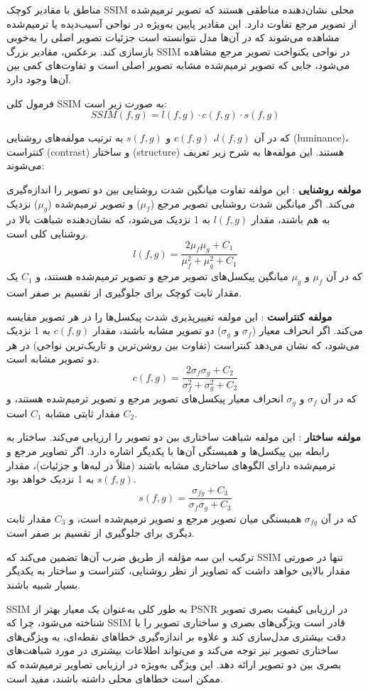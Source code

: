 مناطق با مقادیر کوچک SSIM محلی نشان‌دهنده مناطقی هستند که تصویر ترمیم‌شده از تصویر مرجع تفاوت دارد. این مقادیر پایین به‌ویژه در نواحی آسیب‌دیده یا ترمیم‌شده مشاهده می‌شوند که در آن‌ها مدل نتوانسته است جزئیات تصویر اصلی را به‌خوبی بازسازی کند. برعکس، مقادیر بزرگ SSIM در نواحی یکنواخت تصویر مرجع مشاهده می‌شود، جایی که تصویر ترمیم‌شده مشابه تصویر اصلی است و تفاوت‌های کمی بین آن‌ها وجود دارد.

فرمول کلی SSIM به صورت زیر است:
$$
SSIM(f, g) = l(f, g) \cdot c(f, g) \cdot s(f, g)
$$

که در آن $l(f, g)$، $c(f, g)$ و $s(f, g)$ به ترتیب مولفه‌های روشنایی (luminance)، کنتراست (contrast) و ساختار (structure) هستند. این مولفه‌ها به شرح زیر تعریف می‌شوند:

\textbf{مولفه روشنایی}%
: این مولفه تفاوت میانگین شدت روشنایی بین دو تصویر را اندازه‌گیری می‌کند. اگر میانگین شدت روشنایی تصویر مرجع ($\mu_f$) و تصویر ترمیم‌شده ($\mu_g$) نزدیک به هم باشند، مقدار $l(f, g)$ به 1 نزدیک می‌شود، که نشان‌دهنده شباهت بالا در روشنایی کلی است.
$$
l(f, g) = \frac{2\mu_f \mu_g + C_1}{\mu_f^2 + \mu_g^2 + C_1}
$$
که در آن $\mu_f$ و $\mu_g$ میانگین پیکسل‌های تصویر مرجع و تصویر ترمیم‌شده هستند، و $C_1$ یک مقدار ثابت کوچک برای جلوگیری از تقسیم بر صفر است.

\textbf{مولفه کنتراست}%
:    این مولفه تغییرپذیری شدت پیکسل‌ها را در هر تصویر مقایسه می‌کند. اگر انحراف معیار ($\sigma_f$ و $\sigma_g$) دو تصویر مشابه باشند، مقدار $c(f, g)$ به 1 نزدیک می‌شود، که نشان می‌دهد کنتراست (تفاوت بین روشن‌ترین و تاریک‌ترین نواحی) در هر دو تصویر مشابه است.
$$
c(f, g) = \frac{2\sigma_f \sigma_g + C_2}{\sigma_f^2 + \sigma_g^2 + C_2}
$$
که در آن $\sigma_f$ و $\sigma_g$ انحراف معیار پیکسل‌های تصویر مرجع و تصویر ترمیم‌شده هستند، و $C_2$ مقدار ثابتی مشابه $C_1$ است.

\textbf{مولفه ساختار}
: این مولفه شباهت ساختاری بین دو تصویر را ارزیابی می‌کند. ساختار به رابطه بین پیکسل‌ها و همبستگی آن‌ها با یکدیگر اشاره دارد. اگر تصاویر مرجع و ترمیم‌شده دارای الگوهای ساختاری مشابه باشند (مثلاً در لبه‌ها و جزئیات)، مقدار $s(f, g)$ به 1 نزدیک خواهد بود.
$$
s(f, g) = \frac{\sigma_{fg} + C_3}{\sigma_f \sigma_g + C_3}
$$
که در آن $\sigma_{fg}$ همبستگی میان تصویر مرجع و تصویر ترمیم‌شده است، و $C_3$ مقدار ثابت دیگری برای جلوگیری از تقسیم بر صفر است.

ترکیب این سه مؤلفه از طریق ضرب آن‌ها تضمین می‌کند که SSIM تنها در صورتی مقدار بالایی خواهد داشت که تصاویر از نظر روشنایی، کنتراست و ساختار به یکدیگر بسیار شبیه باشند.

SSIM
 به طور کلی به‌عنوان یک معیار بهتر از PSNR در ارزیابی کیفیت بصری تصویر شناخته می‌شود، چرا که SSIM قادر است ویژگی‌های بصری و ساختاری تصویر را با دقت بیشتری مدل‌سازی کند و علاوه بر اندازه‌گیری خطاهای نقطه‌ای، به ویژگی‌های ساختاری تصویر نیز توجه می‌کند و می‌تواند اطلاعات بیشتری در مورد شباهت‌های بصری بین دو تصویر ارائه دهد. این ویژگی به‌ویژه در ارزیابی تصاویر ترمیم‌شده که ممکن است خطاهای محلی داشته باشند، مفید است.






